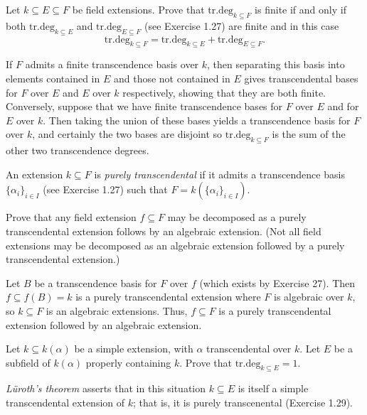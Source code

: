 \documentclass[../../master.tex]{subfiles}
\begin{document}
\begin{problem}
    Let $k \subseteq E \subseteq F$ be field extensions.
    Prove that $\text{tr.deg}_{k \subseteq F}$ is finite if and only if both $\text{tr.deg}_{k \subseteq E}$ and $\text{tr.deg}_{E \subseteq F}$ (see Exercise 1.27) are finite and in this case
    \[
        \text{tr.deg}_{k \subseteq F} = \text{tr.deg}_{k \subseteq E} + \text{tr.deg}_{E \subseteq F}.
    \]
\end{problem}

\begin{solution}
    If $F$ admits a finite transcendence basis over $k$, then separating this basis into elements contained in $E$ and those not contained in $E$ gives transcendental bases for $F$ over $E$ and $E$ over $k$ respectively, showing that they are both finite.
    Conversely, suppose that we have finite transcendence bases for $F$ over $E$ and for $E$ over $k$.
    Then taking the union of these bases yields a transcendence basis for $F$ over $k$, and certainly the two bases are disjoint so $\text{tr.deg}_{k \subseteq F}$ is the sum of the other two transcendence degrees.
\end{solution}

\begin{problem}
    An extension $k \subseteq F$ is \textit{purely transcendental} if it admits a transcendence basis $\{\alpha_i\}_{i \in I}$ (see Exercise 1.27) such that $F = k(\{\alpha_i\}_{i \in I})$.

    Prove that any field extension $f \subseteq F$ may be decomposed as a purely transcendental extension follows by an algebraic extension.
    (Not all field extensions may be decomposed as an algebraic extension followed by a purely transcendental extension.)
\end{problem}

\begin{solution}
    Let $B$ be a transcendence basis for $F$ over $f$ (which exists by Exercise 27).
    Then $f \subseteq f(B) = k$ is a purely transcendental extension where $F$ is algebraic over $k$, so $k \subseteq F$ is an algebraic extensions.
    Thus, $f \subseteq F$ is a purely transcendental extension followed by an algebraic extension.
\end{solution}

\begin{problem}
    Let $k \subseteq k(\alpha)$ be a simple extension, with $\alpha$ transcendental over $k$.
    Let $E$ be a subfield of $k(\alpha)$ properly containing $k$.
    Prove that $\text{tr.deg}_{k \subseteq E} = 1$.

    \textit{L\"uroth's theorem} asserts that in this situation $k \subseteq E$ is itself a simple transcendental extension of $k$;
    that is, it is purely transcenental (Exercise 1.29).
\end{problem}
\end{document}
